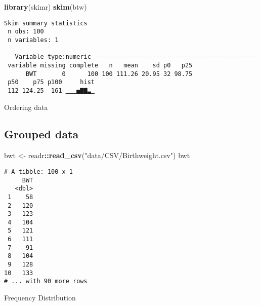 \documentclass[12pt,]{article}
\newenvironment{Shaded}{\begin{snugshade}}{\end{snugshade}}
\newcommand{\KeywordTok}[1]{\textcolor[rgb]{0.13,0.29,0.53}{\textbf{#1}}}
\newcommand{\NormalTok}[1]{#1}
\newcommand{\OperatorTok}[1]{\textcolor[rgb]{0.81,0.36,0.00}{\textbf{#1}}}
\newcommand{\StringTok}[1]{\textcolor[rgb]{0.31,0.60,0.02}{#1}}
\begin{document}
\begin{Shaded}
\begin{Highlighting}[]
\KeywordTok{library}\NormalTok{(skimr)}
\KeywordTok{skim}\NormalTok{(btw)}
\end{Highlighting}
\end{Shaded}

\begin{verbatim}
Skim summary statistics
 n obs: 100 
 n variables: 1 

-- Variable type:numeric ---------------------------------------------
 variable missing complete   n   mean    sd p0   p25
      BWT       0      100 100 111.26 20.95 32 98.75
 p50    p75 p100     hist
 112 124.25  161 ▁▁▁▅▇▇▃▁
\end{verbatim}

Ordering data

\hypertarget{grouped-data}{%
\subsection{Grouped data}\label{grouped-data}}

\begin{Shaded}
\begin{Highlighting}[]
\NormalTok{bwt <-}\StringTok{ }\NormalTok{readr}\OperatorTok{::}\KeywordTok{read_csv}\NormalTok{(}\StringTok{"data/CSV/Birthweight.csv"}\NormalTok{)}
\NormalTok{bwt}
\end{Highlighting}
\end{Shaded}

\begin{verbatim}
# A tibble: 100 x 1
     BWT
   <dbl>
 1    58
 2   120
 3   123
 4   104
 5   121
 6   111
 7    91
 8   104
 9   128
10   133
# ... with 90 more rows
\end{verbatim}

Frequency Distribution
\end{document}
